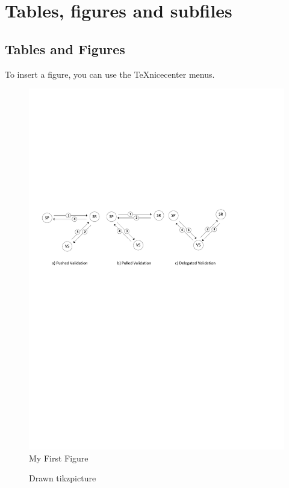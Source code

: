 \documentclass[twocolumn]{article}
\begin{document}
\section{Tables, figures and subfiles}\label{sec:background}

\subsection{Tables and Figures}

To insert a figure, you can use the TeXnicecenter menus. 
\begin{figure}
	\centering
		\includegraphics[width=\linewidth]{att-models-base.pdf}
	\caption{My First Figure}
	\label{fig:att-models-base}
\end{figure}



\begin{figure}
	\centering
	\caption{Drawn tikzpicture} \label{fig:M1}
\end{figure}
\end{document}
